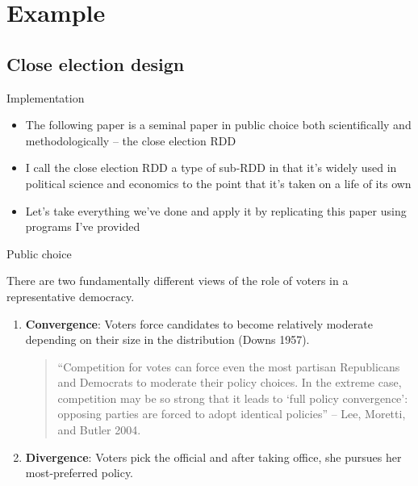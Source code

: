 \documentclass{beamer}
\begin{document}
\section{Example}

\subsection{Close election design}



		
\begin{frame}{Implementation}

\begin{itemize}
\item The following paper is a seminal paper in public choice both scientifically and methodologically -- the close election RDD
\item I call the close election RDD a type of sub-RDD in that it's widely used in political science and economics to the point that it's taken on a life of its own
\item Let's take everything we've done and apply it by replicating this paper using programs I've provided
\end{itemize}

\end{frame}


\begin{frame}{Public choice}

There are two fundamentally different views of the role of voters in a representative democracy.
		\begin{enumerate}
		\item \textbf{Convergence}: Voters force candidates to become relatively moderate depending on their size in the distribution (Downs 1957).  \begin{quote}``Competition for votes can force even the most partisan Republicans and Democrats to moderate their policy choices. In the extreme case, competition may be so strong that it leads to `full policy convergence': opposing parties are forced to adopt identical policies'' -- Lee, Moretti, and Butler 2004.\end{quote}
		\item \textbf{Divergence}: Voters pick the official and after taking office, she pursues her most-preferred policy.  
		\end{enumerate}

\end{frame}
\end{document}
